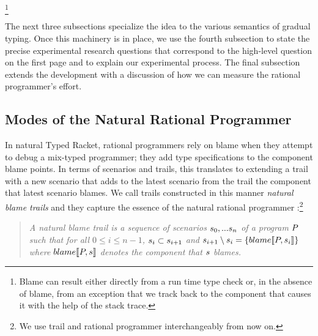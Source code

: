 \footnote{Blame can result either directly from a run time type
check or, in the absence of blame, from an exception that we track back to the
component that causes it with the help of the stack trace.}

The next three subsections specialize the idea to the various semantics of
gradual typing. Once this machinery is in place, we use the fourth subsection to
state the precise experimental research questions that correspond to the
high-level question on the first page and to explain our experimental
process. The final subsection extends the development with a discussion of
how we can measure the rational programmer's effort. 


\subsection{Modes of the Natural Rational Programmer} \label{sub:natural}

In natural Typed Racket, rational programmers rely on blame when they
attempt to debug a mix-typed programmer; they add type specifications to
the component blame points. In terms of scenarios and trails, this
translates to extending a trail with a new scenario that adds to the
latest scenario from the trail the component that latest scenario
blames.  We call trails constructed in this manner \emph{natural blame
trails} and they capture the essence of the natural rational programmer
:\footnote{We use trail and rational programmer interchangeably from now
on.}

\begin{quote}
\it 
A natural blame trail
is a sequence of scenarios $s_0,...s_n$ of a program
$P$  such that for all $0 \leq i \leq n - 1$, $s_i \subset s_{i+1}$ and
  $s_{i+1} \setminus s_i =\{blame\llbracket P, s_i\rrbracket\}$ where
  $blame\llbracket P, s\rrbracket$ denotes the component that $s$ blames.
\end{quote}

